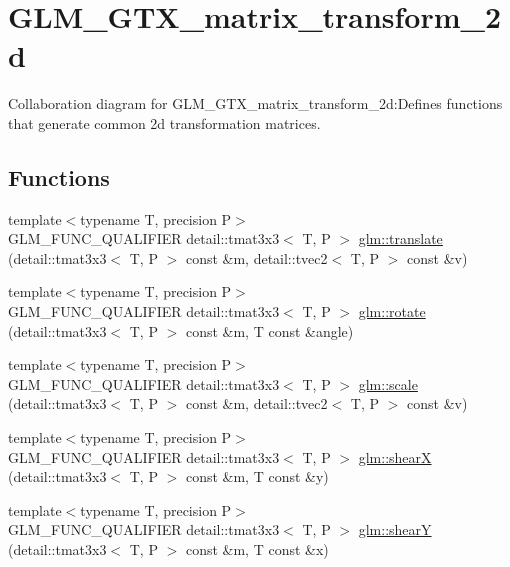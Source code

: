 \hypertarget{group__gtx__matrix__transform__2d}{
\section{GLM\_\-GTX\_\-matrix\_\-transform\_\-2d}
\label{group__gtx__matrix__transform__2d}
}


Collaboration diagram for GLM\_\-GTX\_\-matrix\_\-transform\_\-2d:Defines functions that generate common 2d transformation matrices.  
\subsection*{Functions}
\begin{CompactItemize}
\item 
{\footnotesize template$<$typename T, precision P$>$ }\\GLM\_\-FUNC\_\-QUALIFIER detail::tmat3x3$<$ T, P $>$ \hyperlink{group__gtx__matrix__transform__2d_g307934204fead7ff8ec86bd4499c0adc}{glm::translate} (detail::tmat3x3$<$ T, P $>$ const \&m, detail::tvec2$<$ T, P $>$ const \&v)
\item 
{\footnotesize template$<$typename T, precision P$>$ }\\GLM\_\-FUNC\_\-QUALIFIER detail::tmat3x3$<$ T, P $>$ \hyperlink{group__gtx__matrix__transform__2d_gcfd972a1747f367837d62e00be5d841e}{glm::rotate} (detail::tmat3x3$<$ T, P $>$ const \&m, T const \&angle)
\item 
{\footnotesize template$<$typename T, precision P$>$ }\\GLM\_\-FUNC\_\-QUALIFIER detail::tmat3x3$<$ T, P $>$ \hyperlink{group__gtx__matrix__transform__2d_g275b188a11797f386aeda153a17afcdc}{glm::scale} (detail::tmat3x3$<$ T, P $>$ const \&m, detail::tvec2$<$ T, P $>$ const \&v)
\item 
{\footnotesize template$<$typename T, precision P$>$ }\\GLM\_\-FUNC\_\-QUALIFIER detail::tmat3x3$<$ T, P $>$ \hyperlink{group__gtx__matrix__transform__2d_g921a7ae4b10ba6cc7422be200cf3afd5}{glm::shearX} (detail::tmat3x3$<$ T, P $>$ const \&m, T const \&y)
\item 
{\footnotesize template$<$typename T, precision P$>$ }\\GLM\_\-FUNC\_\-QUALIFIER detail::tmat3x3$<$ T, P $>$ \hyperlink{group__gtx__matrix__transform__2d_g5f6d0ef99f6be6ff1151ca174261004d}{glm::shearY} (detail::tmat3x3$<$ T, P $>$ const \&m, T const \&x)
\end{CompactItemize}


